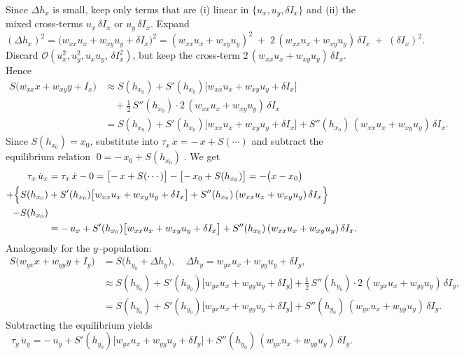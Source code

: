 Since \(\Delta h_x\) is small, keep only terms that are (i) linear in \(\{u_x,u_y,\delta I_x\}\) and (ii) the mixed cross‐terms \(u_x\,\delta I_x\) or \(u_y\,\delta I_x\).  Expand
\[
(\Delta h_x)^2 
= \bigl(w_{xx}u_x + w_{xy}u_y + \delta I_x\bigr)^2
= (w_{xx}u_x + w_{xy}u_y)^2 
\;+\; 2\,(w_{xx}u_x + w_{xy}u_y)\,\delta I_x 
\;+\; (\delta I_x)^2.
\]
Discard \(\mathcal{O}(u_x^2,u_y^2,u_xu_y,\,\delta I_x^2)\), but keep the cross‐term \(2\,(w_{xx}u_x + w_{xy}u_y)\,\delta I_x\).  Hence
\[
\begin{aligned}
S\bigl(w_{xx}x + w_{xy}y + I_x\bigr)
&\approx
S(h_{x_0})
+ S'(h_{x_0})\bigl[w_{xx}u_x + w_{xy}u_y + \delta I_x\bigr]\\
&\quad
+ \tfrac12\,S''(h_{x_0})\cdot 2\,(w_{xx}u_x + w_{xy}u_y)\,\delta I_x\\
&=
S(h_{x_0})
+ S'(h_{x_0})\bigl[w_{xx}u_x + w_{xy}u_y + \delta I_x\bigr]
+ S''(h_{x_0})\,(w_{xx}u_x + w_{xy}u_y)\,\delta I_x.
\end{aligned}
\]
Since \(S(h_{x_0}) = x_0\), substitute into 
\(\tau_x\,\dot x = -\,x + S(\cdots)\) and subtract the equilibrium relation \(\;0 = -\,x_0 + S(h_{x_0})\;\).  We get
\[
\begin{aligned}
\tau_x\,\dot u_x
&= \tau_x\,\dot x 
- 0 
= \bigl[-\,x + S(\cdots)\bigr] 
- \bigl[-\,x_0 + S(h_{x_0})\bigr]
= -\bigl(x - x_0\bigr) \\
+ \Bigl\{S(h_{x_0})
 &+ S'(h_{x_0})\bigl[w_{xx}u_x + w_{xy}u_y + \delta I_x\bigr]
+ S''(h_{x_0})\,(w_{xx}u_x + w_{xy}u_y)\,\delta I_x\Bigr\} \\
- S(h_{x_0}) \\
&= -\,u_x 
+ S'(h_{x_0})\bigl[w_{xx}u_x + w_{xy}u_y + \delta I_x\bigr]
+ S''(h_{x_0})\,(w_{xx}u_x + w_{xy}u_y)\,\delta I_x.
\end{aligned}
\]
Analogously for the \(y\)–population:
\[
\begin{aligned}
S\bigl(w_{yx}x + w_{yy}y + I_y\bigr)
&= S\bigl(h_{y_0} + \Delta h_y\bigr),
\quad
\Delta h_y = w_{yx}u_x + w_{yy}u_y + \delta I_y,\\
&\approx
S(h_{y_0})
+ S'(h_{y_0})\bigl[w_{yx}u_x + w_{yy}u_y + \delta I_y\bigr]
+ \tfrac12\,S''(h_{y_0})\cdot 2\,(w_{yx}u_x + w_{yy}u_y)\,\delta I_y,\\
&= S(h_{y_0})
+ S'(h_{y_0})\bigl[w_{yx}u_x + w_{yy}u_y + \delta I_y\bigr]
+ S''(h_{y_0})\,(w_{yx}u_x + w_{yy}u_y)\,\delta I_y.
\end{aligned}
\]
Subtracting the equilibrium yields
\[
\tau_y\,\dot u_y 
= -\,u_y
+ S'(h_{y_0})\bigl[w_{yx}u_x + w_{yy}u_y + \delta I_y\bigr]
+ S''(h_{y_0})\,(w_{yx}u_x + w_{yy}u_y)\,\delta I_y.
\]
